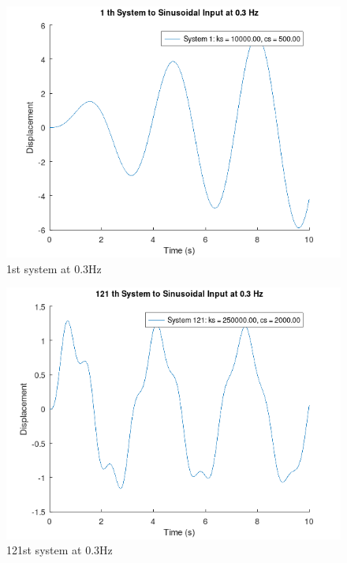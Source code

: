 \documentclass[11pt]{article}
\begin{document}
\begin{figure}[H]
    \centering
    \includegraphics[width=.9\linewidth]{ENG204-Assignment-2-Sinusoidal-f-0.3-1.png}
    \caption{1st system at 0.3Hz}
    \label{fig:1000hz}
\end{figure}

\begin{figure}[H]
    \centering
    \includegraphics[width=.9\linewidth]{ENG204-Assignment-2-Sinusoidal-f-0.3-121.png}
    \caption{121st system at 0.3Hz}
    \label{fig:1000hz}
\end{figure}
\end{document}
